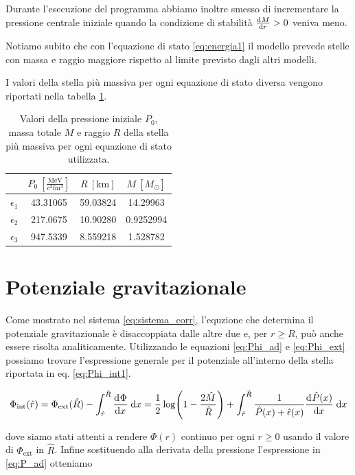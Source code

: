 \documentclass[a4paper, titlepage]{article}
\newcommand{\Punit}[0]{\frac{\unit{\mega\electronvolt}}{c^2 \unit{\femto\cubic\meter}}}
\begin{document}
Durante l'esecuzione del programma abbiamo inoltre smesso di incrementare la pressione centrale iniziale quando la condizione di stabilità $\dv[]{M}{r} > 0$ veniva meno.

Notiamo subito che con l'equazione di stato \ref{eq:energia1} il modello prevede stelle con massa e raggio maggiore rispetto al limite previsto dagli altri modelli.

I valori della stella più massiva per ogni equazione di stato diversa vengono riportati nella tabella \ref{tab:Mgrosso}.

\begin{table}[h!]
    \centering
    \begin{tabular}{c|c|c|c}
        & $P_0~[\Punit]$ & $R~[\unit{\kilo\meter}]$ & $M~[M_\odot]$ \\
         \hline
         $\epsilon_1$ & 43.31065 & 59.03824 & 14.29963 \\
         \hline
         $\epsilon_2$ & 217.0675 & 10.90280 & 0.9252994 \\
         \hline
         $\epsilon_3$ & 947.5339 & 8.559218 & 1.528782 \\
    \end{tabular}
    \caption{Valori della pressione iniziale $P_0$, massa totale $M$ e raggio $R$ della stella più massiva per ogni equazione di stato utilizzata.}
    \label{tab:Mgrosso}
\end{table}


\section{Potenziale gravitazionale}

Come mostrato nel sistema \ref{eq:sistema_corr}, l'equzione che determina il potenziale gravitazionale è disaccoppiata dalle altre due e, per $r \geq R$, può anche essere risolta analiticamente.
Utilizzando le equazioni \ref{eq:Phi_ad} e \ref{eq:Phi_ext} possiamo trovare l'espressione generale per il potenziale all'interno della stella riportata in eq. \ref{eq:Phi_int1}.

\begin{equation}
    \Phi_\text{int} (\hat r) =
    \Phi_\text{ext} (\hat R) - \int_{\hat r}^{\hat R} \dv[]{\Phi}{x} \;\mathrm{d}x =
    \frac{1}{2} \log(1 - \frac{2 \hat M}{\hat R}) + \int_{\hat r}^{\hat R} \frac{1}{\hat P (x) + \hat \epsilon (x)} \dv[]{\hat P (x)}{x} \;\mathrm{d}x
    \label{eq:Phi_int1}
\end{equation}

dove siamo stati attenti a rendere $\Phi (r)$ continuo per ogni $r \geq 0$ usando il valore di $\Phi_\text{ext}$ in $\hat R$. Infine sostituendo alla derivata della pressione l'espressione in \ref{eq:P_ad} otteniamo
\end{document}
